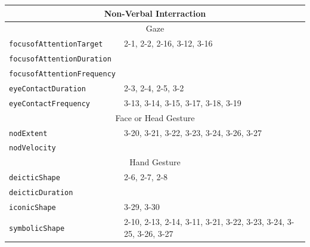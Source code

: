 \documentclass{CSSRforAfrica}
\begin{document}
\begin{table}[H]
\begin{center}
\begin{tabular}{|l l|}
\multicolumn{2}{|c|}{{\footnotesize \bf Non-Verbal Interraction}} \\
\hline
\multicolumn{2}{|c|}{{\footnotesize Gaze}} \\
\hline
{\footnotesize \verb+focusofAttentionTarget+} 	    & {\footnotesize 2-1, 2-2, 2-16, 3-12, 3-16} \vspace{-1mm}\\
{\footnotesize \verb+focusofAttentionDuration+}     & {\footnotesize \verb++} \vspace{-1mm}\\
{\footnotesize \verb+focusofAttentionFrequency+}   & {\footnotesize \verb++} \vspace{-1mm}\\
{\footnotesize \verb+eyeContactDuration+} 	            & {\footnotesize 2-3, 2-4, 2-5, 3-2 } \vspace{-1mm}\\
{\footnotesize \verb+eyeContactFrequency+} 	    & {\footnotesize 3-13, 3-14, 3-15, 3-17, 3-18, 3-19 } \\
\hline
\multicolumn{2}{|c|}{{\footnotesize Face or Head Gesture}} \\
\hline
{\footnotesize \verb+nodExtent+} 	                           & {\footnotesize 3-20, 3-21, 3-22, 3-23, 3-24, 3-26, 3-27 }\vspace{-1mm} \\
{\footnotesize \verb+nodVelocity+} 	                   & {\footnotesize  }\\
\hline
\multicolumn{2}{|c|}{{\footnotesize Hand Gesture}} \\
\hline
{\footnotesize \verb+deicticShape+} 	                 & {\footnotesize 2-6, 2-7, 2-8 } \vspace{-1mm}\\
{\footnotesize \verb+deicticDuration+} 	                 & {\footnotesize \verb++} \vspace{-1mm}\\
{\footnotesize \verb+iconicShape+} 	                 & {\footnotesize 3-29, 3-30  } \vspace{-1mm}\\
{\footnotesize \verb+symbolicShape+} 	                 & {\footnotesize 2-10, 2-13, 2-14, 3-11, 3-21, 3-22, 3-23, 3-24, 3-25, 3-26, 3-27  }\vspace{-1mm} \\

\end{tabular}
\end{center}
\end{table}
\end{document}
